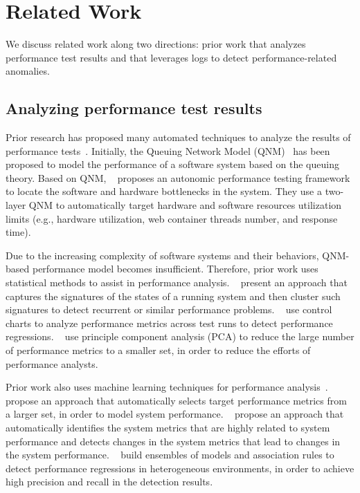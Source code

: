\section{Related Work} \label{sec:relatedwork}
We discuss related work along two directions: prior work that analyzes performance test results and that leverages logs to detect performance-related anomalies.

\subsection{Analyzing performance test results}
Prior research has proposed many automated techniques to analyze the results of performance tests~\citep{DBLP:conf/icst/GaoJBL16,DBLP:journals/tse/JiangH15}.
Initially, the Queuing Network Model (QNM)~\citep{DBLP:books/daglib/0076254} has been proposed to model the performance of a software system based on the queuing theory. 
Based on QNM, ~\citet{DBLP:conf/icac/BarnaLG11} proposes an autonomic performance testing framework to locate the software and hardware bottlenecks in the system. They use a two-layer QNM to automatically target hardware and software resources utilization limits (e.g., hardware utilization, web container threads number, and response time). 

Due to the increasing complexity of software systems and their behaviors, QNM-based performance model becomes insufficient.
Therefore, prior work uses statistical methods to assist in performance analysis.
~\citet{DBLP:conf/sosp/CohenZGSKF05} present an approach that captures the signatures of the states of a running system and then cluster such signatures to detect recurrent or similar performance problems. 
~\citet{DBLP:conf/apsec/NguyenAJHNF11,DBLP:conf/wosp/NguyenAJHNF12} use control charts to analyze performance metrics across test runs to detect performance regressions.
~\citet{DBLP:conf/csmr/MalikJAHFH10,DBLP:conf/icse/MalikHH13} use principle component analysis (PCA) to reduce the large number of performance metrics to a smaller set, in order to reduce the efforts of performance analysts.

Prior work also uses machine learning techniques for performance analysis~\citep{DBLP:conf/wosp/ShangHNF15,DBLP:conf/wosp/XiongPZG13,Foo:2015:ICS:2819009.2819034,DBLP:conf/icdm/LimLZFTLDZ14,DBLP:conf/wosp/DidonaQRT15}.
~\citet{DBLP:conf/wosp/ShangHNF15} propose an approach that automatically selects target performance metrics from a larger set, in order to model system performance. 
~\citet{DBLP:conf/wosp/XiongPZG13} propose an approach that automatically identifies the system metrics that are highly related to system performance and detects changes in the system metrics that lead to changes in the system performance. 
~\citet{Foo:2015:ICS:2819009.2819034} build ensembles of models and association rules to detect performance regressions in heterogeneous environments, in order to achieve high precision and recall in the detection results.

